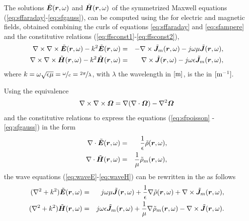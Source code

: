 \par The solutions $\tilde{\mbfit{E}}(\mbfit{r},\omega)$ and $\tilde{\mbfit{H}}(\mbfit{r},\omega)$ of the symmetrized Maxwell equations (\ref{eq:sffaraday}-\ref{eq:sfgauss}), can be computed using the  for electric and magnetic fields, obtained combining the curls of equations \eqref{eq:sffaraday} and \eqref{eq:sfampere} and the constitutive relations (\ref{eq:ffsconst1}-\ref{eq:ffsconst2}),
\begin{eqnarray}
\nabla \times \nabla \times \tilde{\mbfit{E}}(\mbfit{r},\omega) - k^2 \tilde{\mbfit{E}}(\mbfit{r},\omega) &= & -\nabla \times \tilde{\mbfit{J}}_m(\mbfit{r},\omega) - j\omega\mu\tilde{\mbfit{J}}(\mbfit{r},\omega),  \label{eq:waveE} \\
\nabla \times \nabla \times \tilde{\mbfit{H}}(\mbfit{r},\omega) - k^2 \tilde{\mbfit{H}}(\mbfit{r},\omega) &= & \nabla \times \tilde{\mbfit{J}}(\mbfit{r},\omega) - j\omega\epsilon\tilde{\mbfit{J}}_m(\mbfit{r},\omega), \label{eq:waveH}
\end{eqnarray}
where $k = \omega \sqrt{\epsilon \mu} = \nicefrac{\omega}{c} = \nicefrac{2\pi}{\lambda}$, with $\lambda$ the wavelength in $\mathrm{[m]}$, is the  in $\mathrm{[m^{-1}]}$. %
\par Using the equivalence \cite{RothwellCloudE}
\begin{eqnarray}
\nabla \times \nabla \times \mbfit{\Omega} = \nabla(\nabla \cdot \mbfit{\Omega}) - \nabla^2 \mbfit{\Omega} \label{eq:VectVectId}
\end{eqnarray} and the constitutive relations to express the equations (\ref{eq:sfpoisson} - \ref{eq:sfgauss}) in the form
\begin{eqnarray}
\nabla \cdot \tilde{\mbfit{E}}(\mbfit{r},\omega) &= & \frac{1}{\epsilon}\tilde{\rho}(\mbfit{r},\omega), \label{eq:sfPoissonSubs}\\
\nabla \cdot \tilde{\mbfit{H}}(\mbfit{r},\omega) &= & \frac{1}{\mu}\tilde{\rho}_m(\mbfit{r},\omega), \label{eq:sfGaussSubs}
\end{eqnarray} the wave equations (\ref{eq:waveE}-\ref{eq:waveH}) can be rewritten in the  as follows
\begin{eqnarray}
(\nabla^2 + k^2) \tilde{\mbfit{E}}(\mbfit{r},\omega)  &= & j\omega\mu\tilde{\mbfit{J}}(\mbfit{r},\omega) + \frac{1}{\epsilon}\nabla \tilde{\rho}(\mbfit{r},\omega) + \nabla \times \tilde{\mbfit{J}}_m(\mbfit{r},\omega),  \label{eq:waveHelmE} \\
(\nabla^2 + k^2) \tilde{\mbfit{H}}(\mbfit{r},\omega) &= & j\omega\epsilon\tilde{\mbfit{J}}_m(\mbfit{r},\omega) + \frac{1}{\mu}\nabla \tilde{\rho}_m(\mbfit{r},\omega) - \nabla \times \tilde{\mbfit{J}}(\mbfit{r},\omega). \label{eq:waveHelmH}
\end{eqnarray}
